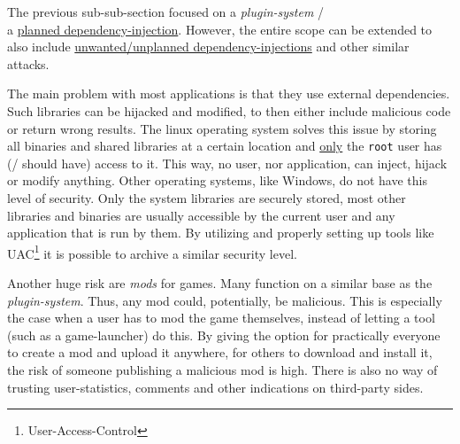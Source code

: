 \clearpage
{}
The previous sub-sub-section focused on a \textit{plugin-system} /\\ a \underline{planned dependency-injection}.
However, the entire scope can be extended to also include \underline{unwanted/unplanned dependency-injections} and other similar attacks.

The main problem with most applications is that they use external dependencies.
Such libraries can be hijacked and modified, to then either include malicious code or return wrong results.
The linux operating system solves this issue by storing all binaries and shared libraries at a certain location and \underline{only} the \texttt{root} user has (/ should have) access to it.
This way, no user, nor application, can inject, hijack or modify anything.
Other operating systems, like Windows, do not have this level of security.
Only the system libraries are securely stored, most other libraries and binaries are usually accessible by the current user and any application that is run by them.
By utilizing and properly setting up tools like UAC\footnote{User-Access-Control} it is possible to archive a similar security level.

Another huge risk are \textit{mods} for games.
Many function on a similar base as the \textit{plugin-system}.
Thus, any mod could, potentially, be malicious.
This is especially the case when a user has to mod the game themselves, instead of letting a tool (such as a game-launcher) do this.
By giving the option for practically everyone to create a mod and upload it anywhere, for others to download and install it, the risk of someone publishing a malicious mod is high.
There is also no way of trusting user-statistics, comments and other indications on third-party sides.